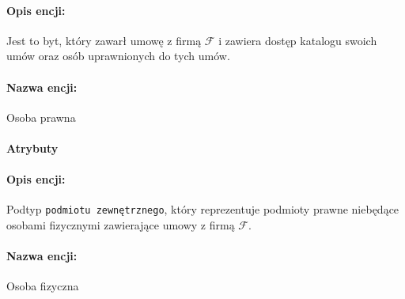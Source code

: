 \documentclass{article}
\begin{document}
\paragraph{Opis encji: \\}
Jest to byt, który zawarł umowę z firmą $\mathcal{F}$ i zawiera dostęp katalogu swoich umów oraz osób uprawnionych do tych umów. 
\paragraph{Nazwa encji:\\ }
Osoba prawna
\paragraph{Atrybuty\\ }
\begin{table}[H]

\caption{Tabela z opisem encji.} 
\end{table}
\paragraph{Opis encji: \\}
Podtyp \texttt{podmiotu zewnętrznego}, który reprezentuje podmioty prawne niebędące osobami fizycznymi zawierające umowy z firmą $\mathcal{F}$.
\paragraph{Nazwa encji:\\ }
Osoba fizyczna
\end{document}

